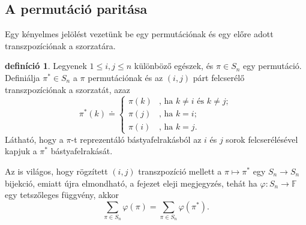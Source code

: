 \documentclass[9pt, a4paper, showtrims]{memoir}
\theoremstyle{plain}
\theoremstyle{remark}
\theoremstyle{definition}
\newtheorem{definition}[proposition]{definíció}
\begin{document}
\subsection{A permutáció paritása}
Egy kényelmes jelölést vezetünk be egy permutációnak és egy előre adott transzpozíciónak a szorzatára.
\begin{definition}
	Legyenek $1\leq i,j\leq n$ különböző egészek,
	és $\pi \in S_{n}$ egy permutáció.
	Definiálja $\pi ^{\ast }\in S_{n}$ a $\pi$ permutációnak és az $\left( i,j \right)$ párt felcserélő transzpozíciónak a szorzatát,
	azaz
	\[
		\pi ^{\ast }\left( k\right) \doteq \left\{
		\begin{array}{ll}
			\pi \left( k\right) &
			\text{, ha }k\neq i\text{ és }k\neq j; \\
			\pi \left( j\right) & \text{, ha }k=i; \\
			\pi \left( i\right) & \text{, ha }k=j.
		\end{array}
		\right.
	\]
	Látható,
	hogy a $\pi$-t reprezentáló bástyafelrakásból az $i$ és $j$ sorok felcserélésével kapjuk a $\pi^{\ast}$ bástyafelrakását.
\end{definition}
Az is világos, hogy rögzített $\left( i,j \right)$ transzpozíció mellett a $\pi\mapsto\pi^\ast$ egy $S_n\to S_n$ bijekció,
emiatt újra elmondható, a fejezet eleji megjegyzés,
tehát ha $\varphi:S_n\to\mathbb{F}$ egy tetszőleges függvény, akkor
\[
	\sum_{\pi\in S_n}\varphi\left( \pi \right)
	=
	\sum_{\pi\in S_n}\varphi\left( \pi^\ast \right).
\]
\end{document}
